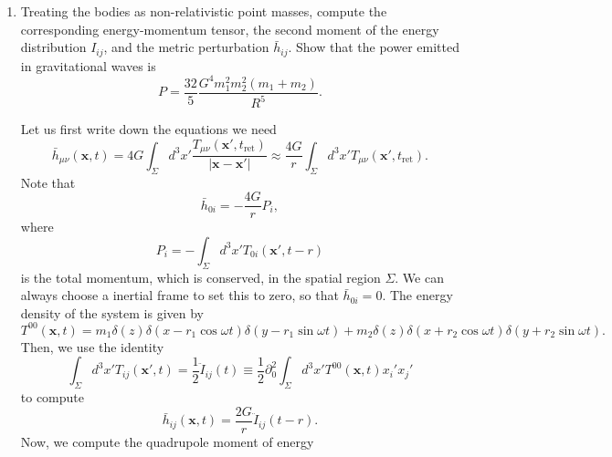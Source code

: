 \begin{enumerate}[label=\roman*)]
    \item Treating the bodies as non-relativistic point masses, compute the corresponding energy-momentum tensor, the second moment of the energy distribution $I_{ij}$, and the metric perturbation $\bar h_{ij}$. Show that the power emitted in gravitational waves is
    \begin{equation}
        P = \frac{32}{5}\frac{G^4 m_1^2 m_2^2(m_1+m_2)}{R^5}.
    \end{equation}
\begin{solution}
        Let us first write down the equations we need
        \begin{equation}
            \bar h_{\mu\nu} (\mathbf{x},t) = 4G \int _\Sigma d^3x' \frac{T_{\mu\nu}(\mathbf{x}',t_\text{ret})}{|\mathbf{x}-\mathbf{x}'|} \approx \frac{4G}{r}\int_\Sigma d^3 x'T_{\mu\nu}(\mathbf{x}',t_\text{ret}).
        \end{equation}
        Note that 
        \begin{equation}
            \bar h_{0i} = -\frac{4G}{r} P_i,
        \end{equation}
        where 
        \begin{equation}
            P_i = -\int _\Sigma d^3x'T_{0i}(\mathbf{x}',t-r)
        \end{equation}
        is the total momentum, which is conserved, in the spatial region $\Sigma$. We can always choose a inertial frame to set this to zero, so that $\bar h_{0i} = 0$.
        The energy density of the system is given by
        \begin{equation}
            T^{00}(\mathbf{x}, t) = m_1\delta(z) \delta(x-r_1\cos\omega t)\delta(y-r_1\sin \omega t) + m_2\delta(z) \delta(x+r_2\cos\omega t)\delta(y+r_2\sin\omega t).
        \end{equation}
        Then, we use the identity
        \begin{equation}
            \int_\Sigma d^3x' T_{ij}(\mathbf{x}',t) = \frac{1}{2}\ddot{I}_{ij}(t) \equiv  \frac{1}{2}\partial_0^2\int _\Sigma d^3x' T^{00}(\mathbf{x},t) x_i' x_j'
        \end{equation}
        to compute
        \begin{equation}
        \bar h_{ij}(\mathbf{x},t) = \frac{2G}{r}\ddot{I}_{ij}(t-r).
        \end{equation}
        Now, we compute the quadrupole moment of energy
        \begin{equation}
            \begin{aligned}

\end{aligned}
\end{equation}
\end{solution}
\end{enumerate}
